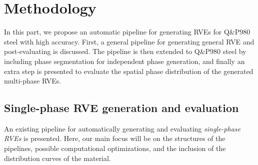 
\chapter{Methodology}
In this part, we propose an automatic pipeline for generating RVEs for Q\&P980 steel with high accuracy. First, a general pipeline for generating general RVE and post-evaluating is discussed. The pipeline is then extended to Q\&P980 steel by including phase segmentation for independent phase generation, and finally an extra step is presented to evaluate the spatial phase distribution of the generated multi-phase RVEs.

\section{Single-phase RVE generation and evaluation}
An existing pipeline for automatically generating and evaluating \textit{single-phase RVEs} is presented. Here, our main focus will be on the structures of the pipelines, possible computational optimizations, and the inclusion of the distribution curves of the material.

